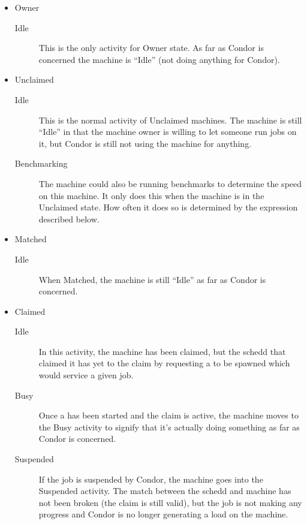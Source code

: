 \begin{itemize}

\item Owner
\begin{description}
\item[Idle] This is the only activity for Owner state.  As far as
  Condor is concerned the machine is ``Idle'' (not doing anything for
  Condor).
\end{description}

\item Unclaimed
\begin{description}
  
\item[Idle] This is the normal activity of Unclaimed machines.  The
  machine is still ``Idle'' in that the machine owner is willing to
  let someone run jobs on it, but Condor is still not using the
  machine for anything.
  
\item[Benchmarking] The machine could also be running benchmarks to
  determine the speed on this machine.  It only does this when the
  machine is in the Unclaimed state.  How often it does so is
  determined by the  expression described below.

\end{description}

\item Matched
\begin{description}
\item[Idle] When Matched, the machine is still ``Idle'' as far as
  Condor is concerned.
\end{description}

\item Claimed
\begin{description}
  
\item[Idle] In this activity, the machine has been claimed, but the
  schedd that claimed it has yet to  the claim by
  requesting a  to be spawned which would service a
  given job.
  
\item[Busy] Once a  has been started and the claim is
  active, the machine moves to the Busy activity to signify that it's
  actually doing something as far as Condor is concerned.
  
\item[Suspended] If the job is suspended by Condor, the machine goes
  into the Suspended activity.
  The match between the schedd and machine has not been broken (the
  claim is still valid), but the job is not making any progress and
  Condor is no longer generating a load on the machine.


\end{description}
\end{itemize}
